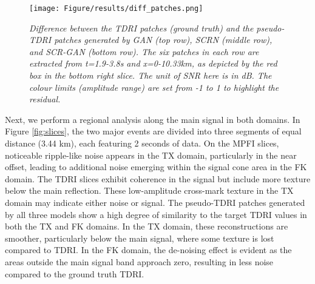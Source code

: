 \begin{landscape}
	\begin{figure}[ht]
		\centering
		\texttt{[image: Figure/results/diff\_patches.png]} %
		\caption{\textit{Difference between the TDRI patches (ground truth) and the pseudo-TDRI patches generated by GAN (top row), SCRN (middle row), and SCR-GAN (bottom row). The six patches in each row are extracted from t=1.9-3.8s and x=0-10.33km, as depicted by the red box in the bottom right slice. The unit of SNR here is in dB. The colour limits (amplitude range) are set from -1 to 1 to highlight the residual.}}
		\label{fig:diff_patches}
	\end{figure}
\end{landscape}

\noindent Next, we perform a regional analysis along the main signal in both domains. In Figure \ref{fig:slices}, the two major events are divided into three segments of equal distance (3.44 km), each featuring 2 seconds of data. On the MPFI slices, noticeable ripple-like noise appears in the TX domain, particularly in the near offset, leading to additional noise emerging within the signal cone area in the FK domain. The TDRI slices exhibit coherence in the signal but include more texture below the main reflection. These low-amplitude cross-mark texture in the TX domain may indicate either noise or signal. The pseudo-TDRI patches generated by all three models show a high degree of similarity to the target TDRI values in both the TX and FK domains. In the TX domain, these reconstructions are smoother, particularly below the main signal, where some texture is lost compared to TDRI. In the FK domain, the de-noising effect is evident as the areas outside the main signal band approach zero, resulting in less noise compared to the ground truth TDRI.\\

